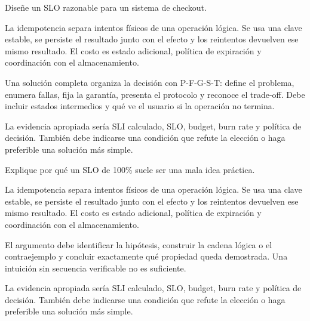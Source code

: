 \documentclass[variant=guia,cover=institutional,mode=screen]{ua-engineering-v6-article}
\begin{document}
\begin{uaexercise}
Diseñe un SLO razonable para un sistema de checkout.
\end{uaexercise}
\begin{uaanswer}
La idempotencia separa intentos físicos de una operación lógica. Se usa una clave estable, se persiste el resultado junto con el efecto y los reintentos devuelven ese mismo resultado. El costo es estado adicional, política de expiración y coordinación con el almacenamiento.

Una solución completa organiza la decisión con P-F-G-S-T: define el problema, enumera fallas, fija la garantía, presenta el protocolo y reconoce el trade-off. Debe incluir estados intermedios y qué ve el usuario si la operación no termina.

La evidencia apropiada sería SLI calculado, SLO, budget, burn rate y política de decisión. También debe indicarse una condición que refute la elección o haga preferible una solución más simple.
\end{uaanswer}

\begin{uaexercise}
Explique por qué un SLO de 100\% suele ser una mala idea práctica.
\end{uaexercise}
\begin{uaanswer}
La idempotencia separa intentos físicos de una operación lógica. Se usa una clave estable, se persiste el resultado junto con el efecto y los reintentos devuelven ese mismo resultado. El costo es estado adicional, política de expiración y coordinación con el almacenamiento.

El argumento debe identificar la hipótesis, construir la cadena lógica o el contraejemplo y concluir exactamente qué propiedad queda demostrada. Una intuición sin secuencia verificable no es suficiente.

La evidencia apropiada sería SLI calculado, SLO, budget, burn rate y política de decisión. También debe indicarse una condición que refute la elección o haga preferible una solución más simple.
\end{uaanswer}
\end{document}
